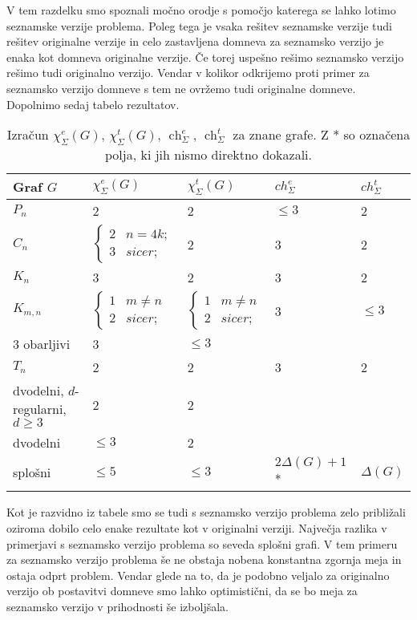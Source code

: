 \documentclass[12pt,a4paper,twoside]{article}
\theoremstyle{definition} %
\theoremstyle{plain} %
\newcommand{\ec}{\chi_{\Sigma}^e}
\newcommand{\ect}{\chi_{\Sigma}^t}
\numberwithin{equation}{section}  %
\DeclareMathOperator{\ch}{ch}
\begin{document}
V tem razdelku smo spoznali močno orodje s pomočjo katerega se lahko lotimo seznamske verzije problema. Poleg tega je vsaka rešitev seznamske verzije tudi rešitev originalne verzije in celo zastavljena domneva za seznamsko verzijo je enaka kot domneva originalne verzije. Če torej uspešno rešimo seznamsko verzijo rešimo tudi originalno verzijo. Vendar v kolikor odkrijemo proti primer za seznamsko verzijo domneve s tem ne ovržemo tudi originalne domneve. Dopolnimo sedaj tabelo rezultatov.
\begin{table}[H]

\caption{\label{tab:tab3} Izračun $\ec(G)$,  $\ect(G)$, $\ch_{\Sigma}^e$, $\ch_{\Sigma}^t$ za znane grafe. Z * so označena polja, ki jih nismo direktno dokazali.}
\centering
\begin{tabular}{|l|l|l|l|l|}
\hline
 Graf $G$ & $\ec(G)$ & $\ect(G) $ & $ch_{\Sigma}^e$ & $ch_{\Sigma}^t$\\ \hline
 $P_n$ & 2 & 2 & $\le 3$ & 2\\ \hline
 $C_n$ & $\begin{cases}
	2 & n = 4k;\\ 
	3 & sicer;
	\end{cases}$ & 2 & 3 & 2\\ \hline
 $K_n$& 3 & 2 & 3 &2\\ \hline
 $K_{m,n}$& $\begin{cases}
	1 & m \neq n\\ 
	2 & sicer;
	\end{cases}$ &$\begin{cases}
	1 & m \neq n\\ 
	2 & sicer;
	\end{cases}$ &3 & $\le 3$\\ \hline
 3 obarljivi& 3 & $\le 3$& & \\ \hline
$T_n$ & 2 & 2& 3 & 2\\ \hline
dvodelni, $d$-regularni, $d \ge 3 $ & 2  & 2& &\\ \hline
dvodelni   & $\le 3$  & 2 & &\\ \hline
splošni   & $\le 5$  &$ \le 3$ & $ 2\Delta(G) + 1$ * & $\Delta(G)$ \\ \hline
\end{tabular}
\end{table}
Kot je razvidno iz tabele smo se tudi s seznamsko verzijo problema zelo približali oziroma dobilo celo enake rezultate kot v originalni verziji. Največja razlika v primerjavi s seznamsko verzijo problema so seveda splošni grafi. V tem primeru za seznamsko verzijo problema še ne obstaja nobena konstantna zgornja meja in ostaja odprt problem. Vendar glede na to, da je podobno veljalo za originalno verzijo ob postavitvi domneve smo lahko optimistični, da se bo meja za seznamsko verzijo v prihodnosti še izboljšala.
\end{document}
